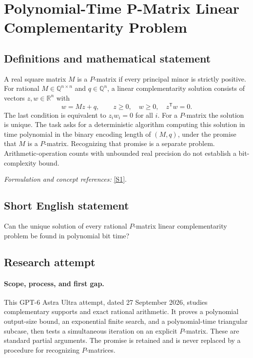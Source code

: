 \documentclass[11pt]{article}
\begin{document}
\section*{\texorpdfstring{Polynomial-Time P-Matrix Linear Complementarity Problem}{Polynomial-Time P-Matrix Linear Complementarity Problem}}\label{424}
\subsection{Definitions and mathematical statement}
A real square matrix $M$ is a $P$-matrix if every principal minor is strictly positive. For rational $M\in{\mathbb{Q}}^{n\times n}$ and $q\in{\mathbb{Q}}^n$, a linear complementarity solution consists of vectors $z,w\in{\mathbb{R}}^n$ with
\[
 w=Mz+q,\qquad z\ge0,\quad w\ge0,\quad z^{\mathsf T}w=0.
\]
The last condition is equivalent to $z_iw_i=0$ for all $i$. For a $P$-matrix the solution is unique. The task asks for a deterministic algorithm computing this solution in time polynomial in the binary encoding length of $(M,q)$, under the promise that $M$ is a $P$-matrix. Recognizing that promise is a separate problem. Arithmetic-operation counts with unbounded real precision do not establish a bit-complexity bound.
\par\smallskip\textit{Formulation and concept references:} \href{https://arxiv.org/abs/2008.08992}{[S1]}.

\subsection{Short English statement}
Can the unique solution of every rational $P$-matrix linear complementarity problem be found in polynomial bit time?
\subsection{Research attempt}
\paragraph{Scope, process, and first gap.}
This GPT-6 Astra Ultra attempt, dated 27 September 2026, studies complementary supports and exact rational arithmetic. It proves a polynomial output-size bound, an exponential finite search, and a polynomial-time triangular subcase, then tests a simultaneous iteration on an explicit $P$-matrix. These are standard partial arguments. The promise is retained and is never replaced by a procedure for recognizing $P$-matrices.
\end{document}
